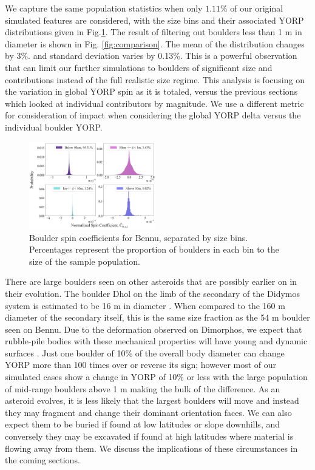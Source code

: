 We capture the same population statistics when only $1.11\%$ of our original simulated features are considered, with the size bins and their associated YORP distributions given in Fig.\ref{fig:bins}. The result of filtering out boulders less than 1 m in diameter is shown in Fig. \ref{fig:comparison}. The mean of the distribution changes by 3\%. and standard deviation varies by 0.13\%. This is a powerful observation that can limit our further simulations to boulders of significant size and contributions instead of the full realistic size regime. This analysis is focusing on the variation in global YORP spin as it is totaled, versus the previous sections which looked at individual contributors by magnitude. We use a different metric for consideration of impact when considering the global YORP delta versus the individual boulder YORP.
\begin{figure}[H]
    \centering
    \includegraphics[width=0.49\textwidth]{fig/bennu_size_binned_spreads.png}
    \caption{Boulder spin coefficients for Bennu, separated by size bins. Percentages represent the proportion of boulders in each bin to the size of the sample population.}
    \label{fig:bins}
\end{figure}
There are large boulders seen on other asteroids that are possibly earlier on in their evolution. The boulder Dhol on the limb of the secondary of the Didymos system is estimated to be 16 m in diameter \cite{Daly2024} \cite{Pajola2024}. When compared to the 160 m diameter of the secondary itself, this is the same size fraction as the 54 m boulder seen on Bennu. Due to the deformation observed on Dimorphos, we expect that rubble-pile bodies with these mechanical properties will have young and dynamic surfaces \cite{Raducan2024}. Just one boulder of 10$\%$ of the overall body diameter can change YORP more than 100 times over or reverse its sign; however most of our simulated cases show a change in YORP of 10\% or less with the large population of mid-range boulders above 1 m making the bulk of the difference. As an asteroid evolves, it is less likely that the largest boulders will move and instead they may fragment and change their dominant orientation faces. We can also expect them to be buried if found at low latitudes or slope downhills, and conversely they may be excavated if found at high latitudes where material is flowing away from them. We discuss the implications of these circumstances in the coming sections.

